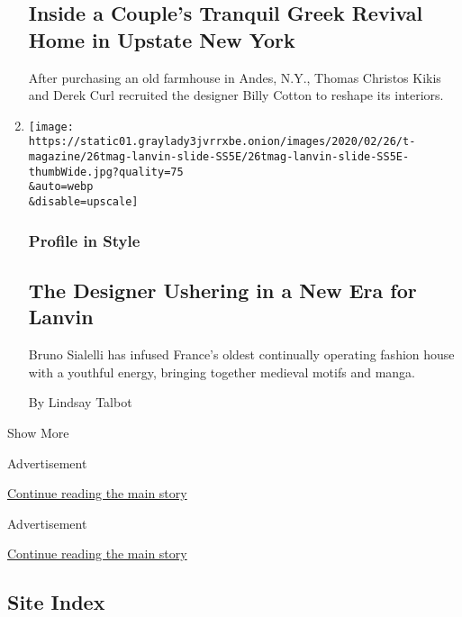 \begin{enumerate}
  \hypertarget{inside-a-couples-tranquil-greek-revival-home-in-upstate-new-york}{%
  \subsection{Inside a Couple's Tranquil Greek Revival Home in Upstate
  New
  York}\label{inside-a-couples-tranquil-greek-revival-home-in-upstate-new-york}}

  After purchasing an old farmhouse in Andes, N.Y., Thomas Christos
  Kikis and Derek Curl recruited the designer Billy Cotton to reshape
  its interiors.
\item
  \href{/2020/02/26/t-magazine/bruno-sialelli-lanvin.html}{}

  \texttt{[image: https://static01.graylady3jvrrxbe.onion/images/2020/02/26/t-magazine/26tmag-lanvin-slide-SS5E/26tmag-lanvin-slide-SS5E-thumbWide.jpg?quality=75\\\&auto=webp\\\&disable=upscale]}

  \hypertarget{profile-in-style}{%
  \subsubsection{Profile in Style}\label{profile-in-style}}

  \hypertarget{the-designer-ushering-in-a-new-era-for-lanvin}{%
  \subsection{The Designer Ushering in a New Era for
  Lanvin}\label{the-designer-ushering-in-a-new-era-for-lanvin}}

  Bruno Sialelli has infused France's oldest continually operating
  fashion house with a youthful energy, bringing together medieval
  motifs and manga.

  By Lindsay Talbot
\end{enumerate}

Show More

Advertisement

\protect\hyperlink{after-mid2}{Continue reading the main story}

Advertisement

\protect\hyperlink{after-mktg}{Continue reading the main story}

\hypertarget{site-index}{%
\subsection{Site Index}\label{site-index}}

